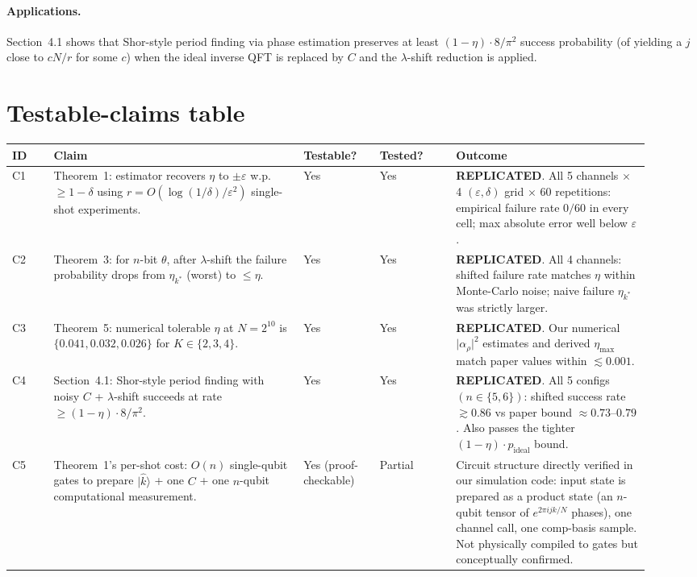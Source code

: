 \documentclass[11pt]{article}
\newcommand{\ket}[1]{\lvert #1 \rangle}
\begin{document}
\paragraph{Applications.}  Section~4.1 shows that Shor-style period
finding via phase estimation preserves at least $(1-\eta)\cdot 8/\pi^2$
success probability (of yielding a $j$ close to $cN/r$ for some $c$)
when the ideal inverse QFT is replaced by $C$ and the $\lambda$-shift
reduction is applied.

\section{Testable-claims table}

\begin{longtable}{@{}p{0.06\linewidth} p{0.36\linewidth} p{0.11\linewidth} p{0.11\linewidth} p{0.28\linewidth}@{}}
\toprule
ID & Claim & Testable? & Tested? & Outcome \\\midrule
C1 & Theorem~1: estimator recovers $\eta$ to $\pm\varepsilon$ w.p.\ $\geq 1-\delta$ using $r=O(\log(1/\delta)/\varepsilon^2)$ single-shot experiments. & Yes & Yes & \textbf{REPLICATED}. All 5 channels $\times$ 4 $(\varepsilon,\delta)$ grid $\times$ 60 repetitions: empirical failure rate $0/60$ in every cell; max absolute error well below $\varepsilon$. \\\midrule
C2 & Theorem~3: for $n$-bit $\theta$, after $\lambda$-shift the failure probability drops from $\eta_{k^*}$ (worst) to $\leq \eta$. & Yes & Yes & \textbf{REPLICATED}. All 4 channels: shifted failure rate matches $\eta$ within Monte-Carlo noise; naive failure $\eta_{k^*}$ was strictly larger. \\\midrule
C3 & Theorem~5: numerical tolerable $\eta$ at $N=2^{10}$ is $\{0.041, 0.032, 0.026\}$ for $K \in \{2,3,4\}$. & Yes & Yes & \textbf{REPLICATED}. Our numerical $\lvert\alpha_\rho\rvert^2$ estimates and derived $\eta_{\max}$ match paper values within $\lesssim 0.001$. \\\midrule
C4 & Section~4.1: Shor-style period finding with noisy $C$ + $\lambda$-shift succeeds at rate $\geq (1-\eta)\cdot 8/\pi^2$. & Yes & Yes & \textbf{REPLICATED}. All 5 configs $(n \in \{5,6\})$: shifted success rate $\gtrsim 0.86$ vs paper bound $\approx 0.73\text{--}0.79$. Also passes the tighter $(1-\eta)\cdot p_{\text{ideal}}$ bound. \\\midrule
C5 & Theorem~1's per-shot cost: $O(n)$ single-qubit gates to prepare $\ket{\hat k}$ + one $C$ + one $n$-qubit computational measurement. & Yes (proof-checkable) & Partial & Circuit structure directly verified in our simulation code: input state is prepared as a product state (an $n$-qubit tensor of $e^{2\pi i j k/N}$ phases), one channel call, one comp-basis sample. Not physically compiled to gates but conceptually confirmed. \\
\bottomrule
\end{longtable}
\end{document}
